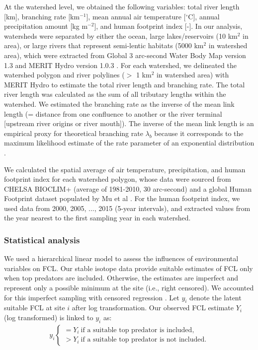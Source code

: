 \documentclass[9pt,twocolumn,twoside]{pnas-new}
\begin{document}
At the watershed level, we obtained the following variables: total river length [km], branching rate [km$^{-1}$], mean annual air temperature [$^\circ$C], annual precipitation amount [kg m$^{-2}$], and human footprint index [-].
In our analysis, watersheds were separated by either the ocean, large lakes/reservoirs (10 km$^{2}$ in area), or large rivers that represent semi-lentic habitats (5000 km$^{2}$ in watershed area), which were extracted from Global 3 arc-second Water Body Map version 1.3 \citep{yamazaki_development_2015} and MERIT Hydro version 1.0.3 \citep{yamazaki_merit_2019}.
For each watershed, we delineated the watershed polygon and river polylines ($>$ 1 km$^2$ in watershed area) with MERIT Hydro to estimate the total river length and branching rate.
The total river length was calculated as the sum of all tributary lengths within the watershed.
We estimated the branching rate as the inverse of the mean link length (= distance from one confluence to another or the river terminal [upstream river origins or river mouth]).
The inverse of the mean link length is an empirical proxy for theoretical branching rate $\lambda_b$ because it corresponds to the maximum likelihood estimate of the rate parameter of an exponential distribution \citep{terui_revisiting_2024}.

We calculated the spatial average of air temperature, precipitation, and human footprint index for each watershed polygon, whose data were sourced from CHELSA BIOCLIM+ (average of 1981-2010, 30 arc-second) \citep{brun_global_2022} and a global Human Footprint dataset populated by Mu et al \citep{mu_global_2022}.
For the human footprint index, we used data from 2000, 2005, ..., 2015 (5-year intervals), and extracted values from the year nearest to the first sampling year in each watershed.

\subsubsection*{Statistical analysis}

We used a hierarchical linear model to assess the influences of environmental variables on FCL.
Our stable isotope data provide suitable estimates of FCL only when top predators are included.
Otherwise, the estimates are imperfect and represent only a possible minimum at the site (i.e., right censored).
We accounted for this imperfect sampling with censored regression \citep{terui_stream_2018, lunn_bugs_2012}.
Let $y_i$ denote the latent suitable FCL at site $i$ after log transformation.
Our observed FCL estimate $Y_i$ (log transformed) is linked to $y_i$ as:
\\
\begin{align}
    y_i 
    \begin{cases}
        = Y_i~\text{if a suitable top predator is included},\\
        > Y_i~\text{if a suitable top predator is not included.}
    \end{cases}
\end{align}
\end{document}
